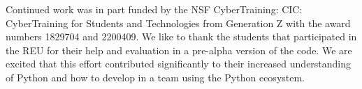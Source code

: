 
\begin{ack}

Continued work was in part funded by the NSF CyberTraining: CIC:
CyberTraining for Students and Technologies from Generation Z with the
award numbers 1829704 and 2200409. We like to thank the students that
participated in the REU for their help and evaluation in a pre-alpha
version of the code. We are excited that this effort contributed
significantly to their increased understanding of Python and how to
develop in a team using the Python ecosystem.

\end{ack}